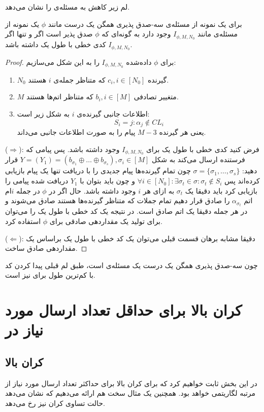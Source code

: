 لم زیر کاهش به مسئله‌ی
\picod
را نشان می‌دهد.
\begin{lemma}
	برای یک نمونه از مسئله‌ی سه-صدق پذیری همگن یک درست مانند
	$\phi$
	یک نمونه از مسئله‌ی
	\picod
	مانند
	$I_{\phi, M, N_0}$
	وجود دارد به گونه‌ای که 
	$\phi$
	صدق پذیر است اگر و تنها اگر 
	$I_{\phi, M, N_0}$
	کدی خطی با طول یک داشته باشد.
\end{lemma}
\begin{proof}
	برای
	$\phi$
	داده‌شده
		$I_{\phi, M, N_0}$
		را به این شکل می‌سازیم:
		\begin{enumerate}
			\item
			$N_0$
			گیرنده
			$c_i, i \in [N_0]$
			که متناظر جمله‌ی
			$i$
			هستند.
			\item
			$M$
			متغییر تصادفی
			$b_i, i \in [M]$
			 که متناظر اتم‌ها هستند.
			 \item 
			 اطلاعات جانبی گیرنده‌ی
			 $i$
			 به شکل زیر است:
			 $$S_i = {j: \alpha_j \notin CL_i}$$
			 یعنی هر گیرنده
			 $M - 3$
			 پیام را به صورت اطلاعات جانبی می‌داند.
		\end{enumerate}
		($\Rightarrow$):
		فرض کنید کدی خطی با طول یک برای
			$I_{\phi, M, N_0}$
			وجود داشته باشد. پس پیامی که فرستنده ارسال می‌کند به شکل
			$Y = (Y_1) = (b_{\sigma_1} \oplus \ldots \oplus b_{\sigma_s}), \sigma_i \in [M]$
			قرار دهید: 
			$\sigma = \{ \sigma_1, \ldots, \sigma_s \}$
			چون تمام گیرنده‌ها پیام جدیدی را با دریافت تنها یک پیام بازیابی کرده‌اند پس
			$\forall i \in [N_0]: \exists \sigma_t \in \sigma: \sigma_t \notin S_i$
			و چون باید بتوان با 
			$Y_1$
			دریافت شده پیامی را بازیابی کرد باید دقیقا یک
			$\sigma_t$
			به ازای هر
			$i$
			وجود داشته باشد. حال اگر در
			$\phi$
			در جمله
			$i$ام اتم
			$\alpha_{\sigma_t}$
			را صادق قرار دهیم تمام جملات که متناظر گیرنده‌ها هستند صادق می‌شوند و در هر جمله دقیقا یک اتم صادق است. در نتیجه یک کد خطی با طول یک را می‌توان برای تولید یک مقداردهی صادقی برای
			$\phi$
			استفاده کرد.
			
			($\Leftarrow$):
			دقیقا مشابه برهان قسمت قبلی می‌توان یک کد خطی با طول یک براساس یک مقداردهی صادق ساخت.
\end{proof}
چون سه-صدق پذیری همگن یک درست یک مسئله‌ی
\nphard
است، طبق لم قبلی پیدا کردن کد با کم‌ترین طول برای
\lpicod 
نیز
\nphard
است.
\section{کران بالا برای حداقل تعداد ارسال مورد نیاز در
\picod}
\subsection{کران بالا}
در این بخش ثابت خواهیم کرد که برای
\picodt
کران بالا برای حداکثر تعداد ارسال مورد نیاز از مرتبه لگاریتمی خواهد بود. همچنین یک مثال سخت هم ارائه می‌دهیم که نشان می‌دهد حالت تساوی کران نیز رخ می‌دهد.

